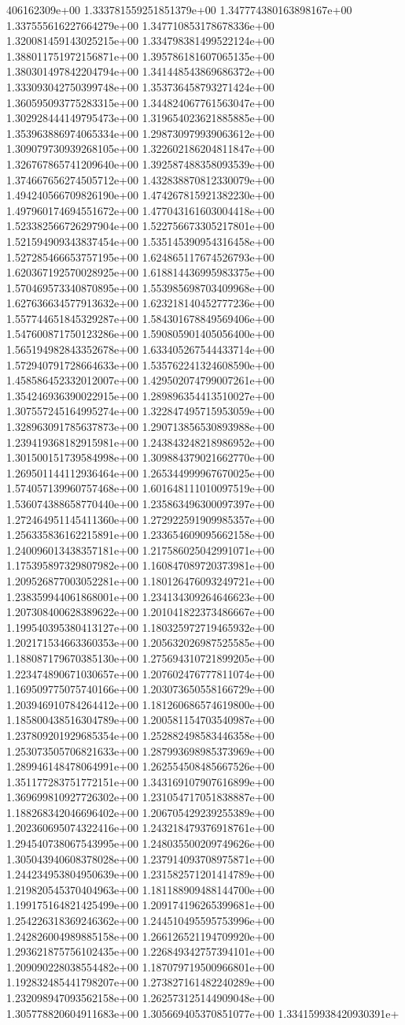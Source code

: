 406162309e+00	1.333781559251851379e+00	1.347774380163898167e+00	1.337555616227664279e+00	1.347710853178678336e+00	1.320081459143025215e+00	1.334798381499522124e+00	1.388011751972156871e+00	1.395786181607065135e+00	1.380301497842204794e+00	1.341448543869686372e+00	1.333093042750399748e+00	1.353736458793271424e+00	1.360595093775283315e+00	1.344824067761563047e+00	1.302928444149795473e+00	1.319654023621885885e+00	1.353963886974065334e+00	1.298730979939063612e+00	1.309079730939268105e+00	1.322602186204811847e+00	1.326767865741209640e+00	1.392587488358093539e+00	1.374667656274505712e+00	1.432838870812330079e+00	1.494240566709826190e+00	1.474267815921382230e+00	1.497960174694551672e+00	1.477043161603004418e+00	1.523382566726297904e+00	1.522756673305217801e+00	1.521594909343837454e+00	1.535145390954316458e+00	1.527285466653757195e+00	1.624865117674526793e+00	1.620367192570028925e+00	1.618814436995983375e+00	1.570469573340870895e+00	1.553985698703409968e+00	1.627636634577913632e+00	1.623218140452777236e+00	1.557744651845329287e+00	1.584301678849569406e+00	1.547600871750123286e+00	1.590805901405056400e+00	1.565194982843352678e+00	1.633405267544433714e+00	1.572940791728664633e+00	1.535762241324608590e+00	1.458586452332012007e+00	1.429502074799007261e+00	1.354246936390022915e+00	1.289896354413510027e+00	1.307557245164995274e+00	1.322847495715953059e+00	1.328963091785637873e+00	1.290713856530893988e+00	1.239419368182915981e+00	1.243843248218986952e+00	1.301500151739584998e+00	1.309884379021662770e+00	1.269501144112936464e+00	1.265344999967670025e+00	1.574057139960757468e+00	1.601648111010097519e+00	1.536074388658770440e+00	1.235863496300097397e+00	1.272464951145411360e+00	1.272922591909985357e+00	1.256335836162215891e+00	1.233654609095662158e+00	1.240096013438357181e+00	1.217586025042991071e+00	1.175395897329807982e+00	1.160847089720373981e+00	1.209526877003052281e+00	1.180126476093249721e+00	1.238359944061868001e+00	1.234134309264646623e+00	1.207308400628389622e+00	1.201041822373486667e+00	1.199540395380413127e+00	1.180325972719465932e+00	1.202171534663360353e+00	1.205632026987525585e+00	1.188087179670385130e+00	1.275694310721899205e+00	1.223474890671030657e+00	1.207602476777811074e+00	1.169509775075740166e+00	1.203073650558166729e+00	1.203946910784264412e+00	1.181260686574619800e+00	1.185800438516304789e+00	1.200581154703540987e+00	1.237809201929685354e+00	1.252882498583446358e+00	1.253073505706821633e+00	1.287993698985373969e+00	1.289946148478064991e+00	1.262554508485667526e+00	1.351177283751772151e+00	1.343169107907616899e+00	1.369699810927726302e+00	1.231054717051838887e+00	1.188268342046696402e+00	1.206705429239255389e+00	1.202360695074322416e+00	1.243218479376918761e+00	1.294540738067543995e+00	1.248035500209749626e+00	1.305043940608378028e+00	1.237914093708975871e+00	1.244234953804950639e+00	1.231582571201414789e+00	1.219820545370404963e+00	1.181188909488144700e+00	1.199175164821425499e+00	1.209174196265399681e+00	1.254226318369246362e+00	1.244510495595753996e+00	1.242826004989885158e+00	1.266126521194709920e+00	1.293621875756102435e+00	1.226849342757394101e+00	1.209090228038554482e+00	1.187079719500966801e+00	1.192832485441798207e+00	1.273827161482240289e+00	1.232098947093562158e+00	1.262573125144909048e+00	1.305778820604911683e+00	1.305669405370851077e+00	1.334159938420930391e+